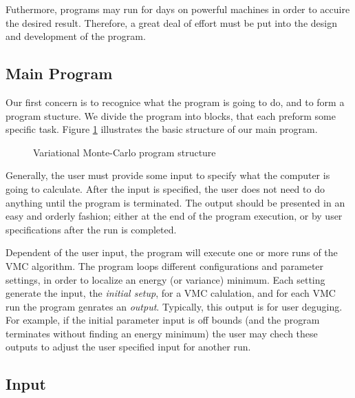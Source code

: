 Futhermore, programs may run for days on powerful machines in order to
accuire the desired result. Therefore, a great deal of effort must be
put into the design and development of the program. \newline


\subsection{Main Program}

Our first concern is to recognice what the program is going to do, and
to form a program stucture. We divide the program into blocks, that
each preform some specific task. Figure \ref{program_stucture} illustrates
the basic structure of our main program. 

\begin{figure}[hbtp]
\begin{center}
  \caption{Variational Monte-Carlo program structure}
  \label{program_stucture}
\end{center}
\end{figure}

Generally, the user must provide some input to specify what the
computer is going to calculate.  After the input is specified, the
user does not need to do anything until the program is terminated. The
output should be presented in an easy and orderly fashion; either at
the end of the program execution, or by user specifications after the
run is completed. \newline

Dependent of the user input, the program will execute one or more runs
of the VMC algorithm. The program loops different configurations and
parameter settings, in order to localize an energy (or variance)
minimum. Each setting generate the input, the \emph{initial setup},
for a VMC calulation, and for each VMC run the program genrates an
\emph{output}. Typically, this output is for user deguging. For
example, if the initial parameter input is off bounds (and the program
terminates without finding an energy minimum) the user may chech these
outputs to adjust the user specified input for another run.


\subsection{Input}

